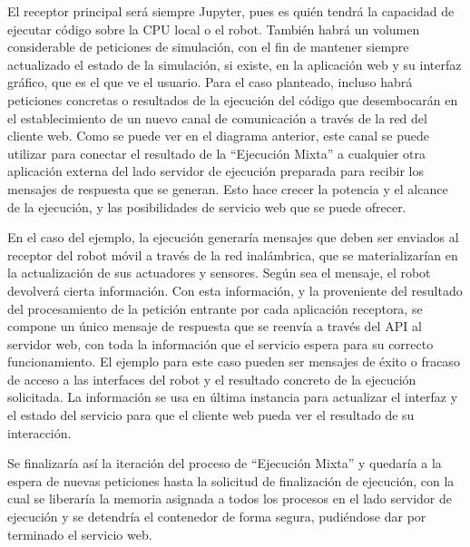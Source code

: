 El receptor principal será siempre Jupyter, pues es quién tendrá la capacidad de ejecutar código sobre la CPU local o el robot. También habrá un volumen considerable de peticiones de simulación, con el fin de mantener siempre actualizado el estado de la simulación, si existe, en la aplicación web y su interfaz gráfico, que es el que ve el usuario. Para el caso planteado, incluso habrá peticiones concretas o resultados de la ejecución del código que desembocarán en el establecimiento de un nuevo canal de comunicación a través de la red del cliente web. Como se puede ver en el diagrama anterior, este canal se puede utilizar para conectar el resultado de la ``Ejecución Mixta'' a cualquier otra aplicación externa del lado servidor de ejecución preparada para recibir los mensajes de respuesta que se generan. Esto hace crecer la potencia y el alcance de la ejecución, y las posibilidades de servicio web que se puede ofrecer.

En el caso del ejemplo, la ejecución generaría mensajes que deben ser enviados al receptor del robot móvil a través de la red inalámbrica, que se materializarían en la actualización de sus actuadores y sensores. Según sea el mensaje, el robot devolverá cierta información. Con esta información, y la proveniente del resultado del procesamiento de la petición entrante por cada aplicación receptora, se compone un único mensaje de respuesta que se reenvía a través del API al servidor web, con toda la información que el servicio espera para su correcto funcionamiento. El ejemplo para este caso pueden ser mensajes de éxito o fracaso de acceso a las interfaces del robot y el resultado concreto de la ejecución solicitada. La información se usa en última instancia para actualizar el interfaz y el estado del servicio para que el cliente web pueda ver el resultado de su interacción.

Se finalizaría así la iteración del proceso de ``Ejecución Mixta'' y quedaría a la espera de nuevas peticiones hasta la solicitud de finalización de ejecución, con la cual se liberaría la memoria asignada a todos los procesos en el lado servidor de ejecución y se detendría el contenedor de forma segura, pudiéndose dar por terminado el servicio web.
